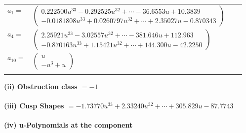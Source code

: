 \documentclass[1p]{elsarticle_modified}
\theoremstyle{definition}
\begin{document}
\begin{tabular}{m{7pt} m{180pt} m{7pt} m{180pt} }
\flushright $a_{1}=$&$\begin{pmatrix}0.222500 u^{33}-0.292525 u^{32}+\cdots-36.6553 u+10.3839\\-0.0181808 u^{33}+0.0260797 u^{32}+\cdots+2.35027 u-0.870343\end{pmatrix}$ \\
\flushright $a_{4}=$&$\begin{pmatrix}2.25921 u^{33}-3.02557 u^{32}+\cdots-381.646 u+112.963\\-0.870163 u^{33}+1.15421 u^{32}+\cdots+144.300 u-42.2250\end{pmatrix}$ \\
\flushright $a_{10}=$&$\begin{pmatrix}u\\- u^3+u\end{pmatrix}$\\&\end{tabular}
\flushleft \textbf{(ii) Obstruction class $= -1$}\\~\\
\flushleft \textbf{(iii) Cusp Shapes $= -1.73770 u^{33}+2.33240 u^{32}+\cdots+305.829 u-87.7743$}\\~\\
\newpage\renewcommand{\arraystretch}{1}
\flushleft \textbf{(iv) u-Polynomials at the component}\newline \\
\end{document}
